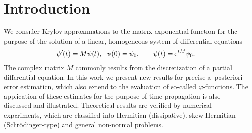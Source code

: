 \documentclass[smallextended]{svjour3pre}%
\numberwithin{equation}{section}
\numberwithin{figure}{section}
\numberwithin{table}{section}
\newcommand\tjnew[1]{{#1}}
\newcommand\phif\varphi
\newcommand{\ee}{{\rm e}}
\newcommand{\ii}{{\rm i}}
\newcommand\x[1]{\textcolor{red}{#1}}
\begin{document}

\newcommand\wa[1]{#1}%
\newcommand\tj[1]{\textcolor{red}{#1}}
\newcommand\ok[1]{\textcolor{magenta}{#1}}

\section{Introduction}

We consider Krylov approximations to the matrix exponential function
for the purpose of the solution of a linear, homogeneous system
of differential equations
%
\begin{equation*}
\psi'(t)=M\psi(t), ~~  \psi(0)=\psi_0,
\qquad \psi(t) = \ee^{tM} \psi_0.
\end{equation*}
%
\tjnew{The complex matrix $M$ commonly results from the discretization of a partial differential equation.}
In this work we present new results for precise a~posteriori error estimation,
which also extend to the evaluation of so-called $ \phif $-functions.
The application of these estimates for the purpose of time propagation
is also discussed and illustrated.
\tjnew{Theoretical results are verified by numerical experiments, which are classified into
Hermitian (dissipative), skew-Hermitian (Schr{\"o}dinger-type) and general non-normal problems.}
\end{document}
